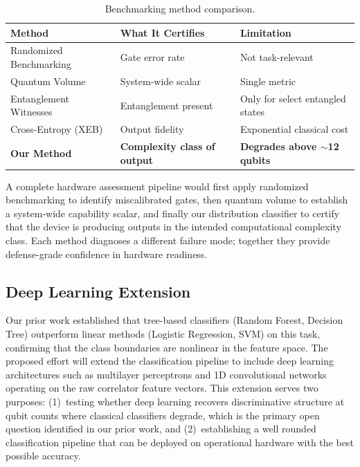 \documentclass[11pt,twocolumn]{article}
\begin{document}
\begin{table}[h!]
\centering
\small
\setlength{\tabcolsep}{4pt}
\caption{Benchmarking method comparison.}
\label{tab:comparison}
\begin{tabular}{p{2.0cm} p{2.5cm} p{2.0cm}}
\toprule
\textbf{Method} & \textbf{What It Certifies} & \textbf{Limitation} \\
\midrule
Randomized Benchmarking \cite{knill2008randomized} & Gate error rate & Not task-relevant \\ \hline
Quantum Volume \cite{blume2020volumetric} & System-wide scalar & Single metric  \\ \hline
Entanglement Witnesses \cite{amaro2020design} & Entanglement present & Only for select entangled states \\ \hline
Cross-Entropy (XEB) \cite{aaronson2019classical} & Output fidelity & Exponential classical cost \\ \hline
\textbf{Our Method} \cite{bremner2016average} & \textbf{Complexity class of output} & \textbf{Degrades above $\sim$12 qubits} \\
\bottomrule
\end{tabular}
\end{table}

A complete hardware assessment pipeline would first apply
randomized benchmarking to identify miscalibrated gates,
then quantum volume to establish a system-wide capability
scalar, and finally our distribution classifier to certify
that the device is producing outputs in the intended
computational complexity class. Each method diagnoses a
different failure mode; together they provide defense-grade
confidence in hardware readiness.

\subsection{Deep Learning Extension}

Our prior work established that tree-based classifiers
(Random Forest, Decision Tree) outperform linear methods
(Logistic Regression, SVM) on this task, confirming that
the class boundaries are nonlinear in the feature space.
The proposed effort will extend the classification pipeline
to include deep learning architectures such as
multilayer perceptrons and 1D convolutional networks
operating on the raw correlator feature vectors. This
extension serves two purposes: (1)~testing whether deep learning recovers
discriminative structure at qubit counts where classical
classifiers degrade, which is the primary open question
identified in our prior work, and (2)~establishing a well rounded classification pipeline that can be deployed on
operational hardware with the best possible accuracy.
\end{document}
